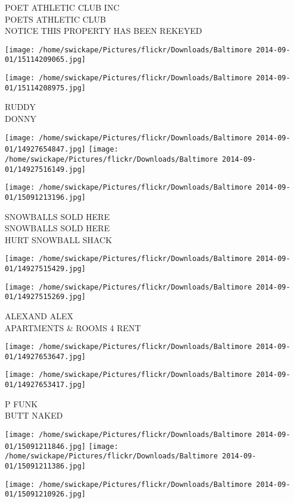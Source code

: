\documentclass[10pt,letterpaper]{article}
\begin{document}
POET ATHLETIC CLUB INC\\
POETS ATHLETIC CLUB\\
NOTICE THIS PROPERTY HAS BEEN REKEYED
\pagebreak

\texttt{[image: /home/swickape/Pictures/flickr/Downloads/Baltimore 2014-09-01/15114209065.jpg]}

\vspace{0.25in}
\texttt{[image: /home/swickape/Pictures/flickr/Downloads/Baltimore 2014-09-01/15114208975.jpg]}

RUDDY\\
DONNY
\pagebreak

\texttt{[image: /home/swickape/Pictures/flickr/Downloads/Baltimore 2014-09-01/14927654847.jpg]}
\texttt{[image: /home/swickape/Pictures/flickr/Downloads/Baltimore 2014-09-01/14927516149.jpg]}

\texttt{[image: /home/swickape/Pictures/flickr/Downloads/Baltimore 2014-09-01/15091213196.jpg]}

SNOWBALLS SOLD HERE\\
SNOWBALLS SOLD HERE\\
HURT SNOWBALL SHACK
\pagebreak

\texttt{[image: /home/swickape/Pictures/flickr/Downloads/Baltimore 2014-09-01/14927515429.jpg]}

\vspace{0.25in}
\texttt{[image: /home/swickape/Pictures/flickr/Downloads/Baltimore 2014-09-01/14927515269.jpg]}

ALEXAND ALEX\\
APARTMENTS \& ROOMS 4 RENT
\pagebreak

\texttt{[image: /home/swickape/Pictures/flickr/Downloads/Baltimore 2014-09-01/14927653647.jpg]}

\vspace{0.25in}
\texttt{[image: /home/swickape/Pictures/flickr/Downloads/Baltimore 2014-09-01/14927653417.jpg]}

P FUNK\\
BUTT NAKED
\pagebreak

\texttt{[image: /home/swickape/Pictures/flickr/Downloads/Baltimore 2014-09-01/15091211846.jpg]}
\texttt{[image: /home/swickape/Pictures/flickr/Downloads/Baltimore 2014-09-01/15091211386.jpg]}

\vspace{0.25in}
\texttt{[image: /home/swickape/Pictures/flickr/Downloads/Baltimore 2014-09-01/15091210926.jpg]}
\end{document}
